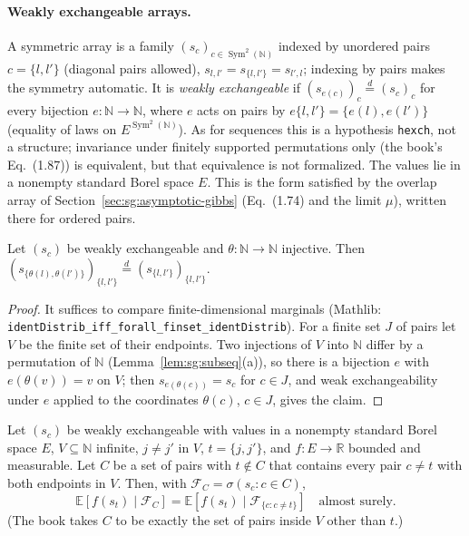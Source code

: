 \paragraph{Weakly exchangeable arrays.}
A symmetric array is a family $(s_c)_{c\in\operatorname{Sym}^2(\mathbb N)}$ indexed by unordered pairs $c=\{l,l'\}$ (diagonal pairs allowed), $s_{l,l'}=s_{\{l,l'\}}=s_{l',l}$; indexing by pairs makes the symmetry automatic. It is \emph{weakly exchangeable} if
$(s_{e(c)})_{c}\overset d=(s_c)_{c}$ for every bijection $e:\mathbb N\to\mathbb N$, where $e$ acts on pairs by $e\{l,l'\}=\{e(l),e(l')\}$ (equality of laws on $E^{\operatorname{Sym}^2(\mathbb N)}$). As for sequences this is a hypothesis \texttt{hexch}, not a structure; invariance under
finitely supported permutations only (the book's Eq.~(1.87)) is equivalent, but that equivalence is not formalized. The values lie in a nonempty standard Borel space $E$. This is the form satisfied by the overlap array of Section~\ref{sec:sg:asymptotic-gibbs}
(Eq.~(1.74) and the limit $\mu$), written there for ordered pairs.

\begin{lemma}\label{lem:sg:subarray}
  \leanok
Let $(s_c)$ be weakly exchangeable and $\theta:\mathbb N\to\mathbb N$ injective. Then $(s_{\{\theta(l),\theta(l')\}})_{\{l,l'\}}\overset d=(s_{\{l,l'\}})_{\{l,l'\}}$.
\end{lemma}

\begin{proof}
  \leanok
It suffices to compare finite-dimensional marginals (Mathlib: \texttt{identDistrib\_iff\_forall\_finset\_identDistrib}). For a finite set $J$ of pairs let $V$ be the finite set of their endpoints. Two injections of $V$ into $\mathbb N$ differ by a permutation of $\mathbb N$ (Lemma~\ref{lem:sg:subseq}(a)),
so there is a bijection $e$ with $e(\theta(v))=v$ on $V$; then $s_{e(\theta(c))}=s_c$ for $c\in J$, and weak exchangeability under $e$ applied to the coordinates $\theta(c)$, $c\in J$, gives the claim.
\end{proof}

\begin{lemma}\label{lem:sg:lemma16}
  \leanok
Let $(s_c)$ be weakly exchangeable with values in a nonempty standard Borel space $E$, $V\subseteq\mathbb N$ infinite, $j\ne j'$ in $V$, $t=\{j,j'\}$, and $f:E\to\mathbb R$ bounded and measurable. Let $C$ be a set of pairs with $t\notin C$ that contains every pair
$c\ne t$ with both endpoints in $V$. Then, with $\mathscr F_C=\sigma(s_c:c\in C)$,
\[\mathbb E[f(s_t)\mid\mathscr F_C]=\mathbb E[f(s_t)\mid\mathscr F_{\{c:c\ne t\}}]\quad\text{almost surely.}\]
(The book takes $C$ to be exactly the set of pairs inside $V$ other than $t$.)
\end{lemma}

